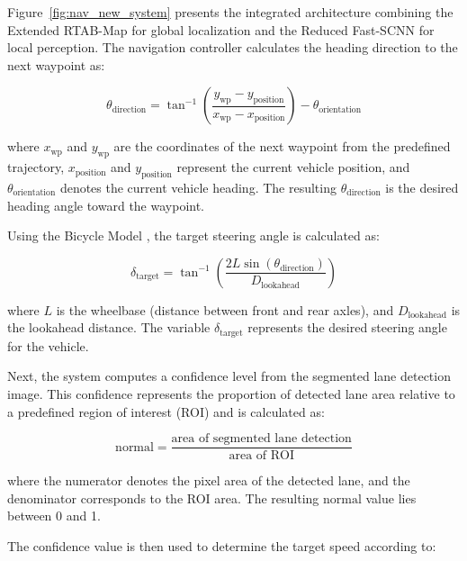 \documentclass[conference, a4paper]{IEEEtran}
\begin{document}
Figure~\ref{fig:nav_new_system} presents the integrated architecture combining the Extended RTAB-Map for global localization and the Reduced Fast-SCNN for local perception. The navigation controller calculates the heading direction to the next waypoint as:

\begin{equation}
	\theta_{\text{direction}} = \tan^{-1}\!\left(\frac{y_{\text{wp}} - y_{\text{position}}}{x_{\text{wp}} - x_{\text{position}}}\right) - \theta_{\text{orientation}}
	\label{eq:waypoint_angle}
\end{equation}

where $x_{\text{wp}}$ and $y_{\text{wp}}$ are the coordinates of the next waypoint from the predefined trajectory, $x_{\text{position}}$ and $y_{\text{position}}$ represent the current vehicle position, and $\theta_{\text{orientation}}$ denotes the current vehicle heading. The resulting $\theta_{\text{direction}}$ is the desired heading angle toward the waypoint.

\par
Using the Bicycle Model \cite{rajamani2011vehicle}, the target steering angle is calculated as:

\begin{equation}
	\delta_{\text{target}} = \tan^{-1}\!\left( \frac{2L \sin(\theta_{\text{direction}})}{D_{\text{lookahead}}} \right)
	\label{eq:bicycle_model_full}
\end{equation}

where $L$ is the wheelbase (distance between front and rear axles), and $D_{\text{lookahead}}$ is the lookahead distance. The variable $\delta_{\text{target}}$ represents the desired steering angle for the vehicle.

\par
Next, the system computes a confidence level from the segmented lane detection image. This confidence represents the proportion of detected lane area relative to a predefined region of interest (ROI) and is calculated as:

\begin{equation}
	\text{normal} = \frac{\text{area of segmented lane detection}}{\text{area of ROI}}
	\label{eq:confidence_level}
\end{equation}

where the numerator denotes the pixel area of the detected lane, and the denominator corresponds to the ROI area. The resulting $\text{normal}$ value lies between 0 and 1.

\par
The confidence value is then used to determine the target speed according to:
\end{document}
